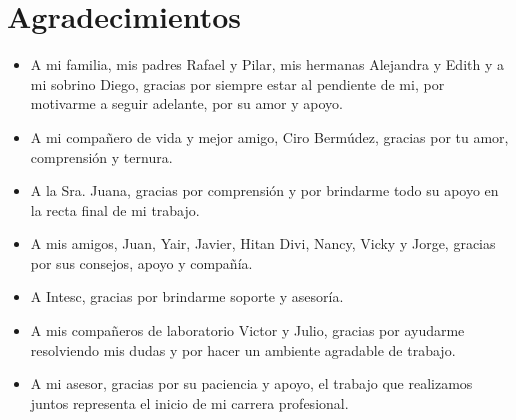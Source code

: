 \chapter{Agradecimientos}

\begin{itemize}
\item A mi familia, mis padres Rafael y Pilar, mis hermanas Alejandra y Edith y a mi sobrino Diego, gracias por siempre estar al pendiente de mi, por motivarme a seguir adelante, por su amor y apoyo.
\item A mi compañero de vida y mejor amigo, Ciro Bermúdez, gracias por tu amor, comprensión y ternura.
\item A la Sra. Juana, gracias por comprensión y por brindarme todo su apoyo en la recta final de mi trabajo.
\item A mis amigos, Juan, Yair, Javier, Hitan Divi, Nancy, Vicky y Jorge, gracias por sus consejos, apoyo y compañía.
\item A Intesc, gracias por brindarme soporte y asesoría.
\item A mis compañeros de laboratorio Victor y Julio, gracias por ayudarme resolviendo mis dudas y por hacer un ambiente agradable de trabajo.
\item A mi asesor, gracias por su paciencia y apoyo, el trabajo que realizamos juntos representa el inicio de mi carrera profesional.
\end{itemize}


